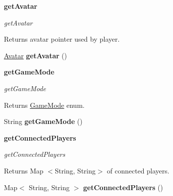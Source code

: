 \begin{Indent}{\bf get\+Avatar}\par
{\em get\+Avatar

\begin{DoxyReturn}{Returns}
avatar pointer used by player. 
\end{DoxyReturn}
}\begin{DoxyCompactItemize}
\item 
\hypertarget{classbattleship_1_1game_1_1Player_a696bbbeb4372438db017740091f6d57f}{}\hyperlink{classbattleship_1_1screen_1_1Avatar}{Avatar} {\bfseries get\+Avatar} ()\label{classbattleship_1_1game_1_1Player_a696bbbeb4372438db017740091f6d57f}

\end{DoxyCompactItemize}
\end{Indent}
\begin{Indent}{\bf get\+Game\+Mode}\par
{\em get\+Game\+Mode

\begin{DoxyReturn}{Returns}
\hyperlink{enumbattleship_1_1game_1_1GameMode}{Game\+Mode} enum. 
\end{DoxyReturn}
}\begin{DoxyCompactItemize}
\item 
\hypertarget{classbattleship_1_1game_1_1Player_abedd302ae67c147d94ff20328ba2358c}{}String {\bfseries get\+Game\+Mode} ()\label{classbattleship_1_1game_1_1Player_abedd302ae67c147d94ff20328ba2358c}

\end{DoxyCompactItemize}
\end{Indent}
\begin{Indent}{\bf get\+Connected\+Players}\par
{\em get\+Connected\+Players

\begin{DoxyReturn}{Returns}
Map $<$String, String$>$ of connected players. 
\end{DoxyReturn}
}\begin{DoxyCompactItemize}
\item 
\hypertarget{classbattleship_1_1game_1_1Player_a34fc5f96d99b78553df54ef22aa44bbc}{}Map$<$ String, String $>$ {\bfseries get\+Connected\+Players} ()\label{classbattleship_1_1game_1_1Player_a34fc5f96d99b78553df54ef22aa44bbc}

\end{DoxyCompactItemize}
\end{Indent}

